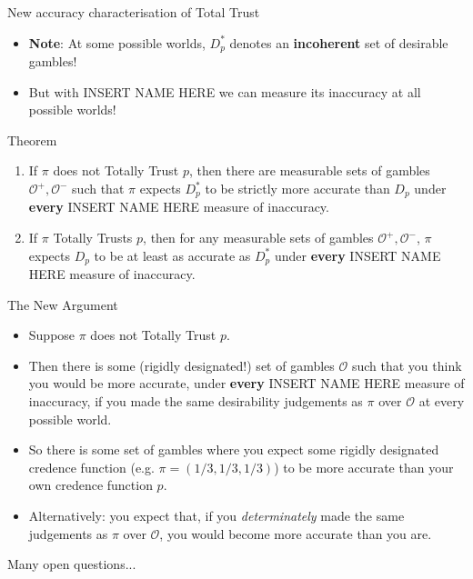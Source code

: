 \documentclass[aspectratio=169, dvipsnames]{beamer}
\newcommand{\Oset}{\mathcal{O}}
\begin{document}
\begin{frame}{New accuracy characterisation of Total Trust}
  \begin{itemize}
  \item \textbf{Note}: At some possible worlds, $D_p^*$ denotes an \alert{\textbf{incoherent}} set of desirable gambles!
  \item But with INSERT NAME HERE we can measure its inaccuracy at all possible worlds!
  \end{itemize}
  \begin{block}{Theorem}
    \begin{enumerate}
      \item If $\pi$ does not Totally Trust $p$, then there are measurable sets of gambles $\Oset^+, \Oset^-$ such that
        $\pi$ expects $D_p^*$ to be strictly more accurate than $D_p$ under \alert{\textbf{every}}
        INSERT NAME HERE measure of inaccuracy.
      \item If $\pi$ Totally Trusts $p$, then for any measurable sets of gambles $\Oset^+, \Oset^-$, $\pi$ expects $D_p$
        to be at least as accurate as $D_p^*$ under \alert{\textbf{every}} INSERT NAME HERE measure of inaccuracy.
    \end{enumerate}
  \end{block}
\end{frame}

\begin{frame}{The New Argument}
  \begin{itemize}
  \item Suppose $\pi$ does not Totally Trust $p$.
  \item Then there is some (rigidly designated!) set of gambles $\Oset$ such that you think you would be more accurate,
    under \textbf{\alert{every}} INSERT NAME HERE measure of inaccuracy, if you made the same desirability judgements
    as $\pi$ over $\Oset$ at every possible world.
  \item So there is some set of gambles where you expect some rigidly designated credence function (e.g. $\pi=(1/3, 1/3, 1/3)$)
    to be more accurate than your own credence function $p$.
  \item Alternatively: you expect that, if you \textit{determinately} made the same judgements as $\pi$ over $\Oset$, you
    would become more accurate than you are.
  \end{itemize}
\end{frame}

\begin{frame}{Many open questions...}
  
\end{frame}
\end{document}
